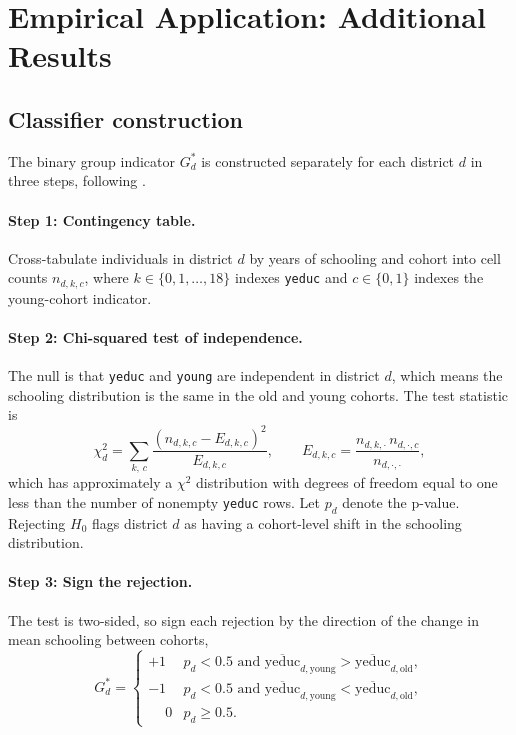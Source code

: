 \section{Empirical Application: Additional Results}\label{sec:app_empirical}

\subsection{Classifier construction}\label{sec:app_classifier}

The binary group indicator $G^*_d$ is constructed separately for each district $d$ in three steps, following \cite[][Section 5.2]{fuzzy2018}.

\paragraph{Step 1: Contingency table.} Cross-tabulate individuals in district $d$ by years of schooling and cohort into cell counts $n_{d,k,c}$, where $k \in \{0, 1, \ldots, 18\}$ indexes \texttt{yeduc} and $c \in \{0, 1\}$ indexes the young-cohort indicator.

\paragraph{Step 2: Chi-squared test of independence.} The null is that \texttt{yeduc} and \texttt{young} are independent in district $d$, which means the schooling distribution is the same in the old and young cohorts. The test statistic is
\begin{equation*}
\chi^2_d = \sum_{k,\,c} \frac{(n_{d,k,c} - E_{d,k,c})^2}{E_{d,k,c}}, \qquad E_{d,k,c} = \frac{n_{d,k,\cdot}\,n_{d,\cdot,c}}{n_{d,\cdot,\cdot}},
\end{equation*}
which has approximately a $\chi^2$ distribution with degrees of freedom equal to one less than the number of nonempty \texttt{yeduc} rows. Let $p_d$ denote the p-value. Rejecting $H_0$ flags district $d$ as having a cohort-level shift in the schooling distribution.

\paragraph{Step 3: Sign the rejection.} The test is two-sided, so \citeauthor{fuzzy2018} sign each rejection by the direction of the change in mean schooling between cohorts,
\begin{equation*}
G^*_d = \begin{cases}
+1 & p_d < 0.5 \text{ and } \overline{\text{yeduc}}_{d,\text{young}} > \overline{\text{yeduc}}_{d,\text{old}}, \\
-1 & p_d < 0.5 \text{ and } \overline{\text{yeduc}}_{d,\text{young}} < \overline{\text{yeduc}}_{d,\text{old}}, \\
\phantom{+}0 & p_d \geq 0.5.
\end{cases}
\end{equation*}

